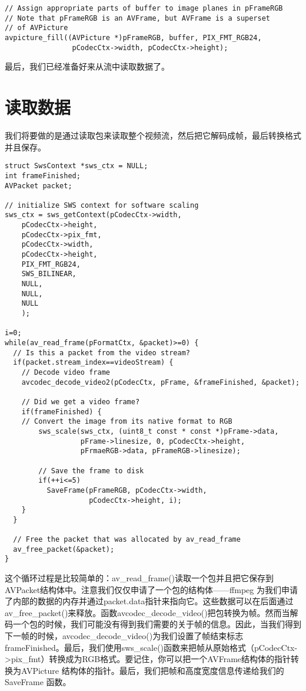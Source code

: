 \begin{lstlisting}
// Assign appropriate parts of buffer to image planes in pFrameRGB
// Note that pFrameRGB is an AVFrame, but AVFrame is a superset
// of AVPicture
avpicture_fill((AVPicture *)pFrameRGB, buffer, PIX_FMT_RGB24,
                pCodecCtx->width, pCodecCtx->height);
\end{lstlisting}

最后，我们已经准备好来从流中读取数据了。

\section{读取数据}

我们将要做的是通过读取包来读取整个视频流，然后把它解码成帧，最后转换格式并且保存。
\begin{lstlisting}
struct SwsContext *sws_ctx = NULL;
int frameFinished;
AVPacket packet;

// initialize SWS context for software scaling
sws_ctx = sws_getContext(pCodecCtx->width,
	pCodecCtx->height,
	pCodecCtx->pix_fmt,
	pCodecCtx->width,
	pCodecCtx->height,
	PIX_FMT_RGB24,
	SWS_BILINEAR,
	NULL,
	NULL,
	NULL
	);

i=0;
while(av_read_frame(pFormatCtx, &packet)>=0) {
  // Is this a packet from the video stream?
  if(packet.stream_index==videoStream) {
    // Decode video frame
    avcodec_decode_video2(pCodecCtx, pFrame, &frameFinished, &packet);

    // Did we get a video frame?
    if(frameFinished) {
    // Convert the image from its native format to RGB
		sws_scale(sws_ctx, (uint8_t const * const *)pFrame->data,
				  pFrame->linesize, 0, pCodecCtx->height,
				  pFrmaeRGB->data, pFrameRGB->linesize);
        
        // Save the frame to disk
        if(++i<=5)
          SaveFrame(pFrameRGB, pCodecCtx->width,
                    pCodecCtx->height, i);
    }
  }

  // Free the packet that was allocated by av_read_frame
  av_free_packet(&packet);
}
\end{lstlisting}



这个循环过程是比较简单的：av_read_frame()读取一个包并且把它保存到AVPacket结构体中。注意我们仅仅申请了一个包的结构体——ffmpeg 为我们申请了内部的数据的内存并通过packet.data指针来指向它。这些数据可以在后面通过av_free_packet()来释放。函数avcodec_decode_video()把包转换为帧。然而当解码一个包的时候，我们可能没有得到我们需要的关于帧的信息。因此，当我们得到下一帧的时候，avcodec_decode_video()为我们设置了帧结束标志frameFinished。最后，我们使用sws_scale()函数来把帧从原始格式（pCodecCtx->pix_fmt）转换成为RGB格式。要记住，你可以把一个AVFrame结构体的指针转换为AVPicture 结构体的指针。最后，我们把帧和高度宽度信息传递给我们的SaveFrame 函数。

